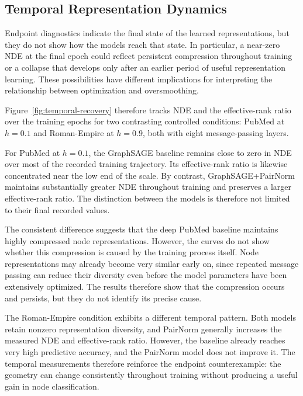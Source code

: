 \documentclass[english]{lni}
\begin{document}
\subsection{Temporal Representation Dynamics}
\label{sec:temporal-dynamics}

Endpoint diagnostics indicate the final state of the learned representations, but they do not show how the models reach that state. In particular, a near-zero NDE at the final epoch could reflect persistent compression throughout training or a collapse that develops only after an earlier period of useful representation learning. These possibilities have different implications for interpreting the relationship between optimization and oversmoothing.

Figure~\ref{fig:temporal-recovery} therefore tracks NDE and the effective-rank ratio over the training epochs for two contrasting controlled conditions: PubMed at $h=0.1$ and Roman-Empire at $h=0.9$, both with eight message-passing layers.

For PubMed at $h=0.1$, the GraphSAGE baseline remains close to zero in NDE over most of the recorded training trajectory. Its effective-rank ratio is likewise concentrated near the low end of the scale. By contrast, GraphSAGE+PairNorm maintains substantially greater NDE throughout training and preserves a larger effective-rank ratio. The distinction between the models is therefore not limited to their final recorded values.

The consistent difference suggests that the deep PubMed baseline maintains highly compressed node representations. However, the curves do not show whether this compression is caused by the training process itself. Node representations may already become very similar early on, since repeated message passing can reduce their diversity even before the model parameters have been extensively optimized. The results therefore show that the compression occurs and persists, but they do not identify its precise cause.

The Roman-Empire condition exhibits a different temporal pattern. Both models retain nonzero representation diversity, and PairNorm generally increases the measured NDE and effective-rank ratio. However, the baseline already reaches very high predictive accuracy, and the PairNorm model does not improve it. The temporal measurements therefore reinforce the endpoint counterexample: the geometry can change consistently throughout training without producing a useful gain in node classification.
\end{document}
